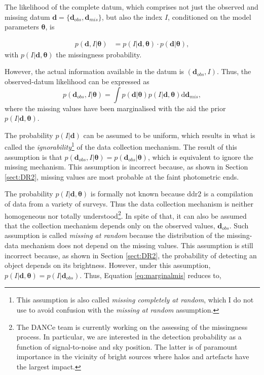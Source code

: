 The likelihood of the complete datum, which comprises not just the observed and missing datum $\mathbf{d}=\{\mathbf{d}_{obs},\mathbf{d}_{mis}\}$, but also the index $I$, conditioned on the model parameters $\boldsymbol{\theta}$, is

\begin{align}
p(\mathbf{d},I|\boldsymbol{\theta})&=p(I|\mathbf{d},\boldsymbol{\theta})\cdot p(\mathbf{d}|\boldsymbol{\theta}), \nonumber
\end{align}
with $p(I|\mathbf{d},\boldsymbol{\theta})$ the missingness probability.

However, the actual information available in the datum is $(\mathbf{d}_{obs},I)$. Thus, the observed-datum likelihood can be expressed as
\begin{equation}
\label{eq:marginalmis}
p(\mathbf{d}_{obs},I|\boldsymbol{\theta})=\int p(\mathbf{d}|\boldsymbol{\theta})p(I|\mathbf{d},\boldsymbol{\theta})\mathrm{d}\mathbf{d}_{mis},
\end{equation}
where the missing values have been marginalised with the aid the prior $p(I|\mathbf{d},\boldsymbol{\theta})$. 

The probability $p(I|\mathbf{d})$ can be assumed to be uniform, which results in what is called the \emph{ignorability}\footnote{This assumption is also called \emph{missing completely at random}, which I do not use to avoid confusion with the \emph{missing at random} assumption.} of the data collection mechanism. The result of this assumption is that $p(\mathbf{d}_{obs},I|\boldsymbol{\theta})= p(\mathbf{d}_{obs}|\boldsymbol{\theta})$, which is equivalent to ignore the missing mechanism. This assumption is incorrect because, as shown in Section \ref{sect:DR2}, missing values are most probable at the faint photometric ends.

The probability $p(I|\mathbf{d},\boldsymbol{\theta})$ is formally not known because \gls{ddr2} is a compilation of data from a variety of surveys. Thus the data collection mechanism is neither homogeneous nor totally understood\footnote{ The DANCe team is currently working on the assessing of the missingness process. In particular, we are interested in the detection probability as a function of signal-to-noise and sky position. The latter is of paramount importance in the vicinity of bright sources where halos and artefacts have the largest impact.}. In spite of that, it can also be assumed that the collection mechanism depends only on the observed values, $\mathbf{d}_{obs}$. Such assumption is called \emph{missing at random} \cite[][p. 450]{Gelman2013} because the distribution of the missing-data mechanism does not depend on the missing values. This assumption is still incorrect because, as shown in Section \ref{sect:DR2},  the probability of detecting an object depends on its brightness. However, under this assumption, $p(I|\mathbf{d},\boldsymbol{\theta})=p(I|\mathbf{d}_{obs})$. Thus, Equation \ref{eq:marginalmis} reduces to,

